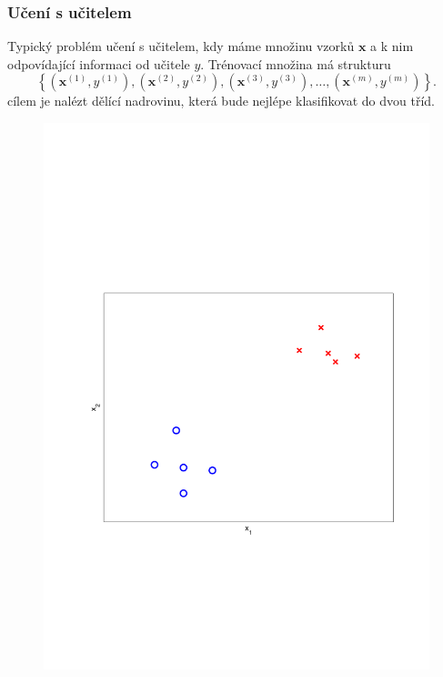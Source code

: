 \subsubsection*{Učení s učitelem}
\par{Typický problém učení s učitelem, kdy máme množinu vzorků $\bm{x}$ a k nim odpovídající informaci od učitele $y$. Trénovací množina má strukturu
\begin{equation}
	\left\lbrace \left( \bm{x}^{\left( 1 \right)} , y^{\left( 1 \right)} \right), \left( \bm{x}^{\left( 2 \right)} , y^{\left( 2 \right)} \right),  \left( \bm{x}^{\left( 3 \right)} , y^{\left( 3 \right)} \right), \ldots,  \left( \bm{x}^{\left( m \right)} , y^{\left( m \right)} \right) \right\rbrace .
\end{equation}
cílem je nalézt dělící nadrovinu, která bude nejlépe klasifikovat do dvou tříd.
\begin{figure}[!ht]
	\centering
	\begin{minipage}[t]{0.48\textwidth}
		\includegraphics[width = \textwidth, trim = 2.5cm 7cm 2cm 9cm]{./Img/UnsupervizedLearning/Intro/supervized.pdf}

\end{minipage}
\end{figure}}

